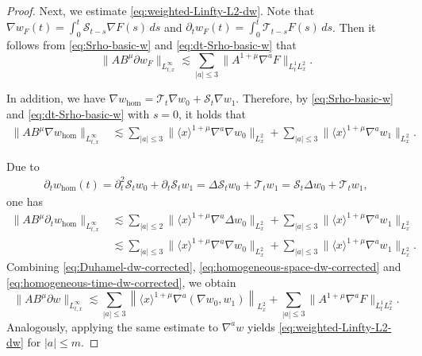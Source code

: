 \documentclass[11pt,twoside]{article}
\def\ls{\lesssim}
\theoremstyle{plain}
\theoremstyle{definition}
\theoremstyle{assumption}
\numberwithin{equation}{section}
\begin{document}
\begin{proof}
		Next, we estimate \eqref{eq:weighted-Linfty-L2-dw}. Note that $\nabla w_F(t)
			=\int_0^t \mathcal{S}_{t-s}\nabla F(s)\,ds$
		and $\partial_t w_F(t)
			=\int_0^t \mathcal{T}_{t-s} F(s)\,ds$.
		Then it follows from \eqref{eq:Srho-basic-w} and \eqref{eq:dt-Srho-basic-w} that
		\begin{equation}\label{eq:Duhamel-dw-corrected}
			\|A B^\mu\partial w_F\|_{L^\infty_{t,x}}
			\ls
			\sum_{|a|\le3}
			\|A^{1+\mu}\nabla^a F\|_{L^1_tL^2_x}.
		\end{equation}
		
		In addition, we have
		$\nabla w_{\mathrm{hom}}
			=\mathcal{T}_t\nabla w_0+\mathcal{S}_{t}\nabla w_1$.
		Therefore, by \eqref{eq:Srho-basic-w} and
		\eqref{eq:dt-Srho-basic-w} with $s=0$, it holds that
		\begin{equation}\label{eq:homogeneous-space-dw-corrected}
			\begin{aligned}
				\|A B^\mu\nabla w_{\mathrm{hom}}\|_{L^\infty_{t,x}}
				&\ls
				\sum_{|a|\le3}
				\|\langle x\rangle^{1+\mu}\nabla^a\nabla w_0\|_{L^2_x}
				+
				\sum_{|a|\le3}
				\|\langle x\rangle^{1+\mu}\nabla^a w_1\|_{L^2_x}.
			\end{aligned}
		\end{equation}
		
		Due to
		\begin{equation}\label{eq:homogeneous-time-identity-dw-corrected}
			\begin{aligned}
				\partial_t w_{\mathrm{hom}}(t)
				=
				\partial_t^2\mathcal{S}_{t} w_0+\partial_t\mathcal{S}_{t} w_1
				=
				\Delta \mathcal{S}_{t} w_0+\mathcal{T}_t w_1
				=
				\mathcal{S}_{t}\Delta w_0+\mathcal{T}_t w_1,
			\end{aligned}
		\end{equation}
		one has
		\begin{equation}\label{eq:homogeneous-time-dw-corrected}
			\begin{aligned}
				\|A B^\mu\partial_t w_{\mathrm{hom}}\|_{L^\infty_{t,x}}
				&\ls
				\sum_{|a|\le2}
				\|\langle x\rangle^{1+\mu}\nabla^a\Delta w_0\|_{L^2_x}
				+
				\sum_{|a|\le3}
				\|\langle x\rangle^{1+\mu}\nabla^a w_1\|_{L^2_x}
				\\
				&\ls
				\sum_{|a|\le3}
				\|\langle x\rangle^{1+\mu}\nabla^a\nabla w_0\|_{L^2_x}
				+
				\sum_{|a|\le3}
				\|\langle x\rangle^{1+\mu}\nabla^a w_1\|_{L^2_x}.
			\end{aligned}
		\end{equation}
		Combining \eqref{eq:Duhamel-dw-corrected},
		\eqref{eq:homogeneous-space-dw-corrected} and
		\eqref{eq:homogeneous-time-dw-corrected}, we obtain
		\begin{equation*}
			\|A B^\mu\partial w\|_{L^\infty_{t,x}}
			\ls
			\sum_{|a|\le3}
			\left\|
			\langle x\rangle^{1+\mu}
			\nabla^a(\nabla w_0,w_1)
			\right\|_{L^2_x}
			+
			\sum_{|a|\le3}
			\|A^{1+\mu}\nabla^aF\|_{L^1_tL^2_x}.
		\end{equation*}
		Analogously, applying the same estimate to $\nabla^a w$
        yields \eqref{eq:weighted-Linfty-L2-dw} for $|a|\le m$.
	   \end{proof}
	
\end{document}
